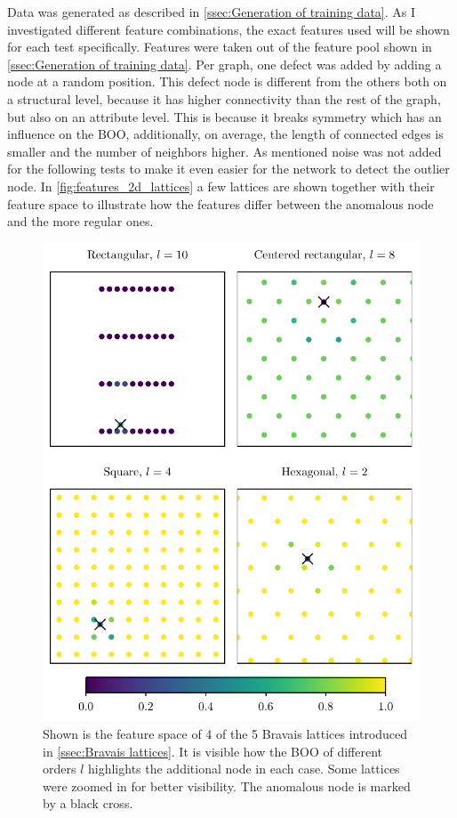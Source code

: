\documentclass[11pt,a4paper]{article}
\begin{document}
Data was generated as described in \autoref{ssec:Generation of training data}. 
As I investigated different feature combinations, the exact features used will be shown for each test specifically. 
Features were taken out of the feature pool shown in \autoref{ssec:Generation of training data}. 
Per graph, one defect was added by adding a node at a random position. 
This defect node is different from the others both on a structural level, because it has higher connectivity than the rest of the graph, but also on an attribute level. 
This is because it breaks symmetry which has an influence on the BOO, additionally, on average, the length of connected edges is smaller and the number of neighbors higher. 
As mentioned noise was not added for the following tests to make it even easier for the network to detect the outlier node. 
In \autoref{fig:features_2d_lattices} a few lattices are shown together with their feature space to illustrate how the features differ between the anomalous node and the more regular ones. 

\begin{figure}[htbp]
    \centering
    \includegraphics{images/plots/features_2d_lattices.pdf}
    \caption{Shown is the feature space of 4 of the 5 Bravais lattices introduced in \autoref{ssec:Bravais lattices}. It is visible how the BOO of different orders $l$ highlights the additional node in each case. Some lattices were zoomed in for better visibility. The anomalous node is marked by a black cross.}
    \label{fig:features_2d_lattices}
\end{figure}
\end{document}
